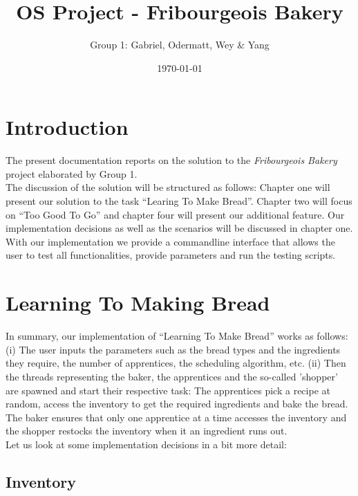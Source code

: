 \documentclass[11pt]{article}
\author{Group 1: Gabriel, Odermatt, Wey \& Yang}
\date{\today}
\title{OS Project - Fribourgeois Bakery}
\begin{document}
\maketitle
\tableofcontents

\setlength\parindent{0pt}
\setlength\parskip{-5pt}

\section{Introduction}
\label{sec:org15d1ca8}

The present documentation reports on the solution to the \emph{Fribourgeois Bakery} project elaborated by Group 1.\\

The discussion of the solution will be structured as follows: Chapter one will present our solution to the task ``Learing To Make Bread''. Chapter two will focus on ``Too Good To Go'' and chapter four will present our additional feature. Our implementation decisions as well as the scenarios will be discussed in chapter one.\\

With our implementation we provide a commandline interface that allows the user to test all functionalities, provide parameters and run the testing scripts.\\

\section{Learning To Making Bread}
\label{sec:org3965db4}

In summary, our implementation of ``Learning To Make Bread'' works as follows: (i) The user inputs the parameters such as the bread types and the ingredients they require, the number of apprentices, the scheduling algorithm, etc. (ii) Then the threads representing the baker, the apprentices and the so-called 'shopper' are spawned and start their respective task: The apprentices pick a recipe at random, access the inventory to get the required ingredients and bake the bread. The baker ensures that only one apprentice at a time accesses the inventory and the shopper restocks the inventory when it an ingredient runs out.\\

Let us look at some implementation decisions in a bit more detail:\\

\subsection{Inventory}
\label{sec:orgc99f62f}
\end{document}
